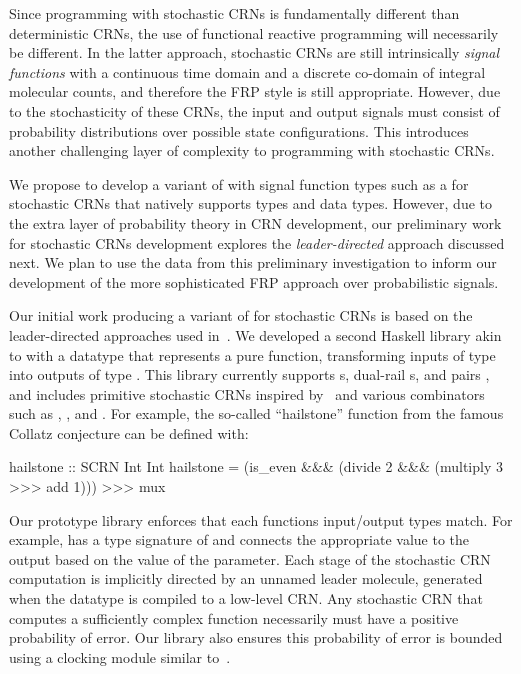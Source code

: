 Since programming with stochastic CRNs is fundamentally different than deterministic CRNs, the use of functional reactive programming will necessarily be different.
In the latter approach, stochastic CRNs are still intrinsically \emph{signal functions} with a continuous time domain and a discrete co-domain of integral molecular counts, and therefore the FRP style is still appropriate.
However, due to the stochasticity of these CRNs, the input and output signals must consist of probability distributions over possible state configurations.
This introduces another challenging layer of complexity to programming with stochastic CRNs.

We propose to develop a variant of \reactamole{} with signal function types such as a  for stochastic CRNs that natively supports types  and  data types.
However, due to the extra layer of probability theory in CRN development, our preliminary work for stochastic CRNs development explores the \emph{leader-directed} approach discussed next.
We plan to use the data from this preliminary investigation to inform our development of the more sophisticated FRP approach over probabilistic signals.

Our initial work producing a variant of \reactamole{} for stochastic CRNs is based on the leader-directed approaches used in~\cite{jAnAsEi08,jSCWB08,Doty2018}.
We developed a second Haskell library akin to \reactamole{} with a datatype  that represents a pure function, transforming inputs of type  into outputs of type .
This library currently supports s, dual-rail s, and pairs , and includes primitive stochastic CRNs inspired by~\cite{cChDoSo12} and various combinators such as \hask{>>>}, \hask{&&&}, and \hask{***}.
For example, the so-called ``hailstone'' function from the famous Collatz conjecture can be defined with:
\begin{center}
\begin{minipage}{0.9\textwidth}
\begin{haskellcode}
hailstone :: SCRN Int Int
hailstone = (is_even &&& (divide 2 &&& (multiply 3 >>> add 1))) >>> mux
\end{haskellcode}
\end{minipage}
\end{center}
Our prototype library enforces that each functions input/output types match.
For example,  has a type signature of  and connects the appropriate value to the output based on the value of the  parameter.
Each stage of the stochastic CRN computation is implicitly directed by an unnamed leader molecule, generated when the  datatype is compiled to a low-level CRN.
Any stochastic CRN that computes a sufficiently complex function necessarily must have a positive probability of error.
Our library also ensures this probability of error is bounded using a clocking module similar to~\cite{jSCWB08}.


